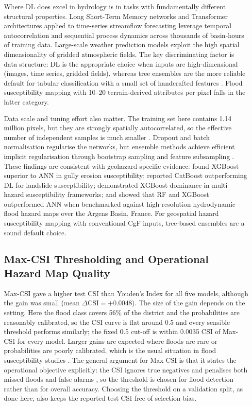 \documentclass[12pt, a4paper]{article}
\begin{document}
Where DL does excel in hydrology is in tasks with fundamentally different structural properties. Long Short-Term Memory networks and Transformer architectures applied to time-series streamflow forecasting \citep{Kratzert2018, Frame2022} leverage temporal autocorrelation and sequential process dynamics across thousands of basin-hours of training data. Large-scale weather prediction models \citep{Bi2023, Lam2023} exploit the high spatial dimensionality of gridded atmospheric fields. The key discriminating factor is data structure: DL is the appropriate choice when inputs are high-dimensional (images, time series, gridded fields), whereas tree ensembles are the more reliable default for tabular classification with a small set of handcrafted features \citep{mcelfresh2023, shwartzziv2022}. Flood susceptibility mapping with 10--20 terrain-derived attributes per pixel falls in the latter category.

Data scale and tuning effort also matter. The training set here contains 1.14 million pixels, but they are strongly spatially autocorrelated, so the effective number of independent samples is much smaller \citep{roberts2017}. Dropout and batch normalisation regularise the networks, but ensemble methods achieve efficient implicit regularisation through bootstrap sampling and feature subsampling \citep{dietterich2000, breiman2001}. These findings are consistent with geohazard-specific evidence: \citet{Arabameri2021} found XGBoost superior to ANN in gully erosion susceptibility; \citet{Iban2022} reported CatBoost outperforming DL for landslide susceptibility; \citet{zhang2022} demonstrated XGBoost dominance in multi-hazard susceptibility frameworks; and \citet{Arora2024Argens} showed that RF and XGBoost outperformed ANN when benchmarked against high-resolution hydrodynamic flood hazard maps over the Argens Basin, France. For geospatial hazard susceptibility mapping with conventional CgF inputs, tree-based ensembles are a sound default choice.

\subsection{Max-CSI Thresholding and Operational Hazard Map Quality}

Max-CSI gave a higher test CSI than Youden's Index for all five models, although the gain was small (mean $\Delta\text{CSI} = +0.0048$). The size of the gain depends on the setting. Here the flood class covers 56\% of the district and the probabilities are reasonably calibrated, so the CSI curve is flat around 0.5 and every sensible threshold performs similarly; the fixed 0.5 cut-off is within 0.0035 CSI of Max-CSI for every model. Larger gains are expected where floods are rare or probabilities are poorly calibrated, which is the usual situation in flood susceptibility studies \citep{tehrany2019, Costache2020, Arora2022SERRA}. The general argument for Max-CSI is that it states the operational objective explicitly: the CSI ignores true negatives and penalises both missed floods and false alarms \citep{schaefer1990, mason2003}, so the threshold is chosen for flood detection rather than for overall accuracy. Choosing the threshold on a validation split, as done here, also keeps the reported test CSI free of selection bias.
\end{document}
